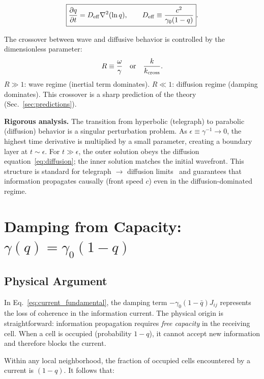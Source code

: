 \documentclass[aps,prd,twocolumn,showpacs,superscriptaddress,preprintnumbers]{revtex4-2}
\begin{document}
\begin{equation}
\boxed{\frac{\partial q}{\partial t} = D_{\rm eff}\nabla^2(\ln q), \qquad D_{\rm eff} \equiv \frac{c^2}{\gamma_0(1-q)}}.
\label{eq:diffusion}
\end{equation}

The crossover between wave and diffusive behavior is controlled by the dimensionless parameter:
\begin{equation}
R \equiv \frac{\omega}{\gamma} \quad\text{or}\quad \frac{k}{k_{\rm cross}}.
\end{equation}
$R\gg1$: wave regime (inertial term dominates). $R\ll1$: diffusion regime (damping dominates).
This crossover is a sharp prediction of the theory (Sec.~\ref{sec:predictions}).

\textbf{Rigorous analysis.}
The transition from hyperbolic (telegraph) to parabolic (diffusion) behavior is a singular perturbation problem.
As $\epsilon\equiv\gamma^{-1}\to0$, the highest time derivative is multiplied by a small parameter, creating a boundary layer at $t\sim\epsilon$.
For $t\gg\epsilon$, the outer solution obeys the diffusion equation~\eqref{eq:diffusion}; the inner solution matches the initial wavefront.
This structure is standard for telegraph $\to$ diffusion limits~\cite{Jou:2010} and guarantees that information propagates causally (front speed $c$) even in the diffusion-dominated regime.

\section{Damping from Capacity: $\gamma(q)=\gamma_0(1-q)$}
\label{sec:gamma}

\subsection{Physical Argument}

In Eq.~\eqref{eq:current_fundamental}, the damping term $-\gamma_0(1-\bar{q})J_{ij}$ represents the loss of coherence in the information current.
The physical origin is straightforward: information propagation requires \emph{free capacity} in the receiving cell.
When a cell is occupied (probability $1-q$), it cannot accept new information and therefore blocks the current.

Within any local neighborhood, the fraction of occupied cells encountered by a current is $(1-q)$.
It follows that:
\end{document}
